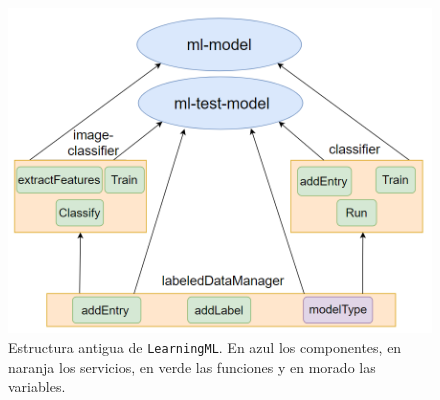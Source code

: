 \documentclass[a4paper, 12pt]{book}
\begin{document}
\begin{figure}
	\centering
	\includegraphics[width=12cm, keepaspectratio]{img/modeloantiguo}
	\caption{Estructura antigua de \texttt{LearningML}. En azul los componentes, en naranja los servicios, en verde las funciones y en morado las variables.}				\label{fig:modeloantiguo}
\end{figure}
\end{document}
